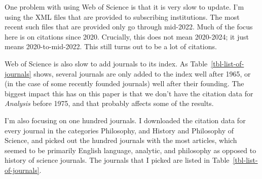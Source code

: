 \documentclass[
  10pt,
  letterpaper,
  DIV=11,
  numbers=noendperiod,
  twoside]{scrartcl}
\begin{document}
One problem with using Web of Science is that it is very slow to update.
I'm using the XML files that are provided to subscribing institutions.
The most recent such files that are provided only go through mid-2022.
Much of the focus here is on citations since 2020. Crucially, this does
not mean 2020-2024; it just means 2020-to-mid-2022. This still turns out
to be a lot of citations.

Web of Science is also slow to add journals to its index. As
Table~\ref{tbl-list-of-journals} shows, several journals are only added
to the index well after 1965, or (in the case of some recently founded
journals) well after their founding. The biggest impact this has on this
paper is that we don't have the citation data for \emph{Analysis} before
1975, and that probably affects some of the results.

I'm also focusing on one hundred journals. I downloaded the citation
data for every journal in the categories Philosophy, and History and
Philosophy of Science, and picked out the hundred journals with the most
articles, which seemed to be primarily English language, analytic, and
philosophy as opposed to history of science journals. The journals that
I picked are listed in Table~\ref{tbl-list-of-journals}.
\end{document}
